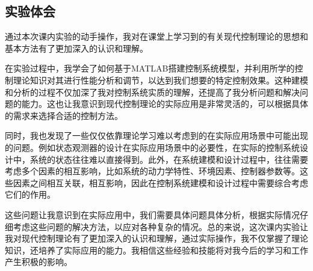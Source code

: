 \documentclass[UTF8]{article}
\begin{document}
\subsection{实验体会}
通过本次课内实验的动手操作，我对在课堂上学习到的有关现代控制理论的思想和基本方法有了更加深入的认识和理解。

在实验过程中，我学会了如何基于MATLAB搭建控制系统模型，并利用所学的控制理论知识对其进行性能分析和调节，以达到我们想要的特定控制效果。这种建模和分析的过程不仅加深了我对控制系统实质的理解，还提高了我分析问题和解决问题的能力。这也让我意识到现代控制理论的实际应用是非常灵活的，可以根据具体的需求来选择合适的控制方法。

同时，我也发现了一些仅仅依靠理论学习难以考虑到的在实际应用场景中可能出现的问题。例如状态观测器的设计在实际应用场景中的必要性，在实际的控制系统设计中，系统的状态往往难以直接得到。此外，在系统建模和设计过程中，往往需要考虑多个因素的相互影响，比如系统的动力学特性、环境因素、控制器参数等。这些因素之间相互关联，相互影响，因此在控制系统建模和设计过程中需要综合考虑它们的作用。

这些问题让我意识到在实际应用中，我们需要具体问题具体分析，根据实际情况仔细考虑这些问题的解决方法，以应对各种复杂的情况。总的来说，这次课内实验让我对现代控制理论有了更加深入的认识和理解，通过实际操作，我不仅掌握了理论知识，还培养了实际应用的能力。我相信这些经验和技能将对我今后的学习和工作产生积极的影响。
\end{document}
